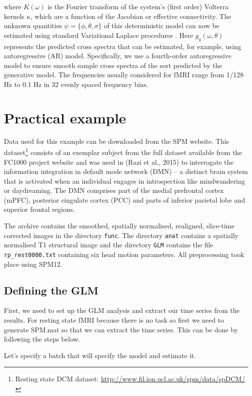 where $K(\omega)$ is the Fourier transform of the system's (first order) Volterra kernels  $\kappa$, which are a function of the Jacobian or effective connectivity. The unknown quantities $\psi=\{\phi,\theta,\sigma\}$ of this deterministic model can now be estimated using standard Variational Laplace procedures \cite{FristonLaplace2007}. Here $g_{y} (\omega,\theta)$ represents the predicted cross spectra that can be estimated, for example, using autoregressive (AR) model. Specifically, we use a fourth-order autoregressive model to ensure smooth sample cross spectra of the sort predicted by the generative model. The frequencies usually considered for fMRI range from 1/128 Hz to 0.1 Hz in 32 evenly spaced frequency bins.

\section{Practical example}

Data used for this example can be downloaded from the SPM website. This dataset\footnote{Resting state DCM dataset: \url{http://www.fil.ion.ucl.ac.uk/spm/data/spDCM/}} consists of an exemplar subject from the full dataset available from the FC1000 project website and was used in (Razi et al., 2015) to interrogate the information integration in default mode network (DMN) -- a distinct brain system that is activated when an individual engages in introspection like mindwandering or daydreaming. The DMN comprises part of the medial prefrontal cortex (mPFC), posterior cingulate cortex (PCC) and parts of inferior parietal lobe and superior frontal regions.

The archive contains the smoothed, spatially normalised, realigned, slice-time corrected images in the directory \texttt{func}. The directory \texttt{anat} contains a spatially normalised T1 structural image and the directory \texttt{GLM} contains the file \texttt{rp\_rest0000.txt} containing six head motion parameters. All preprocessing took place using SPM12.

\subsection{Defining the GLM}
First, we need to set up the GLM analysis and extract our time series from the results. For resting state fMRI because there is no task so first we need to generate SPM.mat so that we can extract the time series. This can be done by following the steps below.

Let's specify a batch that will specify the model and estimate it.

